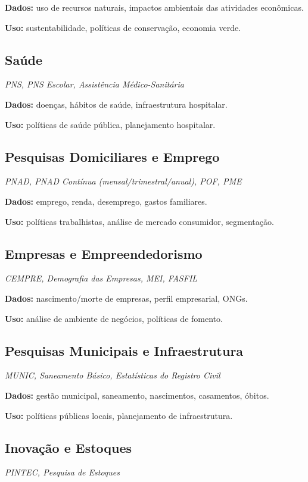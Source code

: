 \documentclass[12pt,a4paper]{article}
\begin{document}
\textbf{Dados:} uso de recursos naturais, impactos ambientais das atividades econômicas.

\textbf{Uso:} sustentabilidade, políticas de conservação, economia verde.

\subsection{Saúde}
\textit{PNS, PNS Escolar, Assistência Médico-Sanitária}

\textbf{Dados:} doenças, hábitos de saúde, infraestrutura hospitalar.

\textbf{Uso:} políticas de saúde pública, planejamento hospitalar.

\subsection{Pesquisas Domiciliares e Emprego}
\textit{PNAD, PNAD Contínua (mensal/trimestral/anual), POF, PME}

\textbf{Dados:} emprego, renda, desemprego, gastos familiares.

\textbf{Uso:} políticas trabalhistas, análise de mercado consumidor, segmentação.

\subsection{Empresas e Empreendedorismo}
\textit{CEMPRE, Demografia das Empresas, MEI, FASFIL}

\textbf{Dados:} nascimento/morte de empresas, perfil empresarial, ONGs.

\textbf{Uso:} análise de ambiente de negócios, políticas de fomento.

\subsection{Pesquisas Municipais e Infraestrutura}
\textit{MUNIC, Saneamento Básico, Estatísticas do Registro Civil}

\textbf{Dados:} gestão municipal, saneamento, nascimentos, casamentos, óbitos.

\textbf{Uso:} políticas públicas locais, planejamento de infraestrutura.

\subsection{Inovação e Estoques}
\textit{PINTEC, Pesquisa de Estoques}
\end{document}
